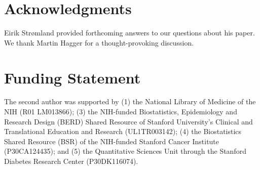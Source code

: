 \documentclass[man,floatsintext]{apa7}
\begin{document}
\section{Acknowledgments} 
\noindent Eirik Str{\o}mland provided forthcoming answers to our questions about his paper. We thank Martin Hagger for a thought-provoking discussion.

\section{Funding Statement } 
\noindent The second author was supported by (1) the National Library of Medicine of the NIH (R01 LM013866); (3) the NIH-funded Biostatistics,
Epidemiology and Research Design (BERD) Shared Resource of Stanford University's Clinical and Translational Education and Research (UL1TR003142); (4) the Biostatistics Shared Resource (BSR) of the NIH-funded Stanford Cancer Institute (P30CA124435); and (5) the Quantitative Sciences Unit through the Stanford Diabetes Research Center (P30DK116074).

\newpage



\pagebreak

\printbibliography
\end{document}
